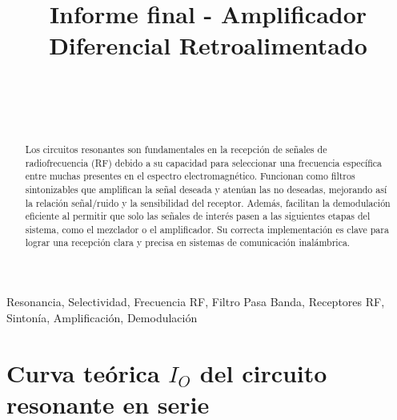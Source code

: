 \documentclass[conference]{IEEEtran}
\begin{document}
	
	\title{Informe final - Amplificador Diferencial Retroalimentado}
	\author{
		\\
		\\
		\\
		\and
		\and
		\and
	}
	
	\maketitle
	\begin{abstract}
		Los circuitos resonantes son fundamentales en la recepción de señales de radiofrecuencia (RF) debido a su capacidad para seleccionar una frecuencia específica entre muchas presentes en el espectro electromagnético. Funcionan como filtros sintonizables que amplifican la señal deseada y atenúan las no deseadas, mejorando así la relación señal/ruido y la sensibilidad del receptor. Además, facilitan la demodulación eficiente al permitir que solo las señales de interés pasen a las siguientes etapas del sistema, como el mezclador o el amplificador. Su correcta implementación es clave para lograr una recepción clara y precisa en sistemas de comunicación inalámbrica.
	\end{abstract}
	\begin{IEEEkeywords}
		Resonancia, Selectividad, Frecuencia RF, Filtro Pasa Banda, Receptores RF, Sintonía, Amplificación, Demodulación
	\end{IEEEkeywords}
	
	\section{Curva teórica $I_O$ del circuito resonante en serie}
	
\end{document}
